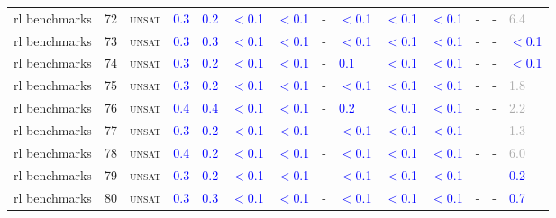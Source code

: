 \begin{center}
{\begin{longtable}{@{}llllllllllllll@{}}
rl benchmarks & 72 & \textsc{unsat} & \textcolor{blue}{0.3} & \textcolor{blue}{0.2} & \textcolor{blue}{$<$0.1} & \textcolor{blue}{$<$0.1} & - & \textcolor{blue}{$<$0.1} & \textcolor{blue}{$<$0.1} & \textcolor{blue}{$<$0.1} & - & - & \textcolor{darkgray}{6.4} \\
rl benchmarks & 73 & \textsc{unsat} & \textcolor{blue}{0.3} & \textcolor{blue}{0.3} & \textcolor{blue}{$<$0.1} & \textcolor{blue}{$<$0.1} & - & \textcolor{blue}{$<$0.1} & \textcolor{blue}{$<$0.1} & \textcolor{blue}{$<$0.1} & - & - & \textcolor{blue}{$<$0.1} \\
rl benchmarks & 74 & \textsc{unsat} & \textcolor{blue}{0.3} & \textcolor{blue}{0.2} & \textcolor{blue}{$<$0.1} & \textcolor{blue}{$<$0.1} & - & \textcolor{blue}{0.1} & \textcolor{blue}{$<$0.1} & \textcolor{blue}{$<$0.1} & - & - & \textcolor{blue}{$<$0.1} \\
rl benchmarks & 75 & \textsc{unsat} & \textcolor{blue}{0.3} & \textcolor{blue}{0.2} & \textcolor{blue}{$<$0.1} & \textcolor{blue}{$<$0.1} & - & \textcolor{blue}{$<$0.1} & \textcolor{blue}{$<$0.1} & \textcolor{blue}{$<$0.1} & - & - & \textcolor{darkgray}{1.8} \\
rl benchmarks & 76 & \textsc{unsat} & \textcolor{blue}{0.4} & \textcolor{blue}{0.4} & \textcolor{blue}{$<$0.1} & \textcolor{blue}{$<$0.1} & - & \textcolor{blue}{0.2} & \textcolor{blue}{$<$0.1} & \textcolor{blue}{$<$0.1} & - & - & \textcolor{darkgray}{2.2} \\
rl benchmarks & 77 & \textsc{unsat} & \textcolor{blue}{0.3} & \textcolor{blue}{0.2} & \textcolor{blue}{$<$0.1} & \textcolor{blue}{$<$0.1} & - & \textcolor{blue}{$<$0.1} & \textcolor{blue}{$<$0.1} & \textcolor{blue}{$<$0.1} & - & - & \textcolor{darkgray}{1.3} \\
rl benchmarks & 78 & \textsc{unsat} & \textcolor{blue}{0.4} & \textcolor{blue}{0.2} & \textcolor{blue}{$<$0.1} & \textcolor{blue}{$<$0.1} & - & \textcolor{blue}{$<$0.1} & \textcolor{blue}{$<$0.1} & \textcolor{blue}{$<$0.1} & - & - & \textcolor{darkgray}{6.0} \\
rl benchmarks & 79 & \textsc{unsat} & \textcolor{blue}{0.3} & \textcolor{blue}{0.2} & \textcolor{blue}{$<$0.1} & \textcolor{blue}{$<$0.1} & - & \textcolor{blue}{$<$0.1} & \textcolor{blue}{$<$0.1} & \textcolor{blue}{$<$0.1} & - & - & \textcolor{blue}{0.2} \\
rl benchmarks & 80 & \textsc{unsat} & \textcolor{blue}{0.3} & \textcolor{blue}{0.3} & \textcolor{blue}{$<$0.1} & \textcolor{blue}{$<$0.1} & - & \textcolor{blue}{$<$0.1} & \textcolor{blue}{$<$0.1} & \textcolor{blue}{$<$0.1} & - & - & \textcolor{blue}{0.7} \\

\end{longtable}}
\end{center}
